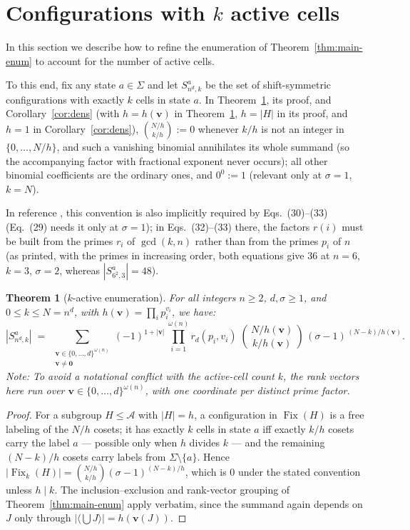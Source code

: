 \documentclass[11pt,a4paper]{article}
\newtheorem{theorem}{Theorem}[section]
\theoremstyle{remark}
\DeclareMathOperator{\Fix}{Fix}
\newcommand{\A}{\mathcal{A}}
\newcommand{\vv}{\mathbf{v}}
\begin{document}
\section{Configurations with $k$ active cells}\label{sec:kactive}

In this section we describe how to refine the enumeration of Theorem~\ref{thm:main-enum} to account for the number of active cells.

To this end, fix any state $a\in\Sigma$ and let $S^a_{n^d,k}$ be the set of
shift-symmetric configurations with exactly $k$ cells in state $a$.
In Theorem~\ref{thm:kactive}, its proof, and
Corollary~\ref{cor:dens} (with $h=h(\vv)$ in Theorem~\ref{thm:kactive},
$h=|H|$ in its proof, and $h=1$ in Corollary~\ref{cor:dens}),
$\binom{N/h}{k/h}:=0$ whenever
$k/h$ is not an integer in $\{0,\dots,N/h\}$, and such a vanishing
binomial annihilates its
whole summand (so the accompanying factor with fractional exponent never
occurs); all other binomial coefficients are the ordinary ones, and
$0^0:=1$ (relevant only at $\sigma=1$, $k=N$). 

In reference \cite{banda2019}, this convention is also implicitly required by Eqs.~(30)--(33)
 (Eq.~(29) needs it only at $\sigma=1$); in
Eqs.~(32)--(33) there, the factors $r(i)$ must be built from the primes
$r_i$ of $\gcd(k,n)$ rather than from the primes $p_i$ of $n$ (as printed,
with the primes in increasing order, both equations give $36$ at $n=6$,
$k=3$, $\sigma=2$, whereas $|S^a_{6^2,3}|=48$).

\begin{theorem}[$k$-active enumeration]\label{thm:kactive}
For all integers $n\ge2$, $d, \sigma\ge1$, and $0\le k\le N=n^d$, with
$h(\vv)=\prod_i p_i^{v_i}$, we have:
\[
  |S^a_{n^d,k}| \;=\; \sum_{\substack{\vv\in\{0,\dots,d\}^{\omega(n)}\\
  \vv\neq\mathbf 0}} (-1)^{1+|\vv|}\,\prod_{i=1}^{\omega(n)} r_d(p_i,v_i)\;
  \binom{\,N/h(\vv)\,}{\,k/h(\vv)\,}\,
  (\sigma-1)^{\,(N-k)/h(\vv)} .
\]
Note: To avoid a notational conflict with the active-cell
count $k$, the rank vectors here run over $\vv\in\{0,\dots,d\}^{\omega(n)}$,
with one coordinate per distinct prime factor.
\end{theorem}

\begin{proof}
For a subgroup $H\le\A$ with $|H|=h$, a configuration in $\Fix(H)$ is a
free labeling of the $N/h$ cosets; it has exactly $k$ cells in state $a$
iff exactly $k/h$ cosets carry the label $a$ --- possible only when
$h$ divides $k$ --- and the remaining $(N-k)/h$ cosets carry labels from
$\Sigma\setminus\{a\}$. Hence
$|\Fix_k(H)|=\binom{N/h}{k/h}(\sigma-1)^{(N-k)/h}$, which is $0$ under the
stated convention unless $h\mid k$. The inclusion--exclusion and
rank-vector grouping of Theorem~\ref{thm:main-enum} apply verbatim, since
the summand again depends on $J$ only through $|\langle\bigcup J\rangle|
= h(\vv(J))$.
\end{proof}
\end{document}
